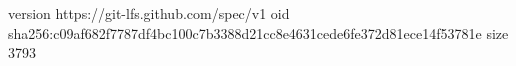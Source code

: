 version https://git-lfs.github.com/spec/v1
oid sha256:c09af682f7787df4bc100c7b3388d21cc8e4631cede6fe372d81ece14f53781e
size 3793
